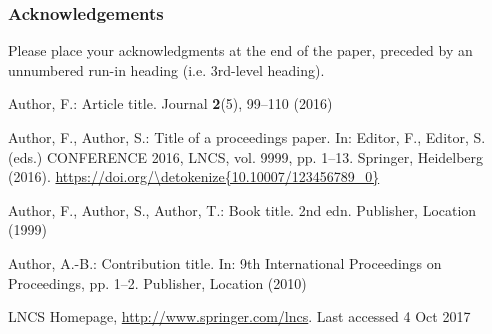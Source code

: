 \documentclass[runningheads]{llncs}
\def\doi#1{\href{https://doi.org/\detokenize{#1}}{\url{https://doi.org/\detokenize{#1}}}}
\begin{document}
\subsubsection{Acknowledgements} Please place your acknowledgments at
the end of the paper, preceded by an unnumbered run-in heading (i.e.
3rd-level heading).


%
%
%
% 
% 
%
\begin{thebibliography}{8}
Author, F.: Article title. Journal \textbf{2}(5), 99--110 (2016)

Author, F., Author, S.: Title of a proceedings paper. In: Editor,
F., Editor, S. (eds.) CONFERENCE 2016, LNCS, vol. 9999, pp. 1--13.
Springer, Heidelberg (2016). \doi{10.10007/123456789_0}

Author, F., Author, S., Author, T.: Book title. 2nd edn. Publisher,
Location (1999)

Author, A.-B.: Contribution title. In: 9th International Proceedings
on Proceedings, pp. 1--2. Publisher, Location (2010)

LNCS Homepage, \url{http://www.springer.com/lncs}. Last accessed 4
Oct 2017
\end{thebibliography}
\end{document}

